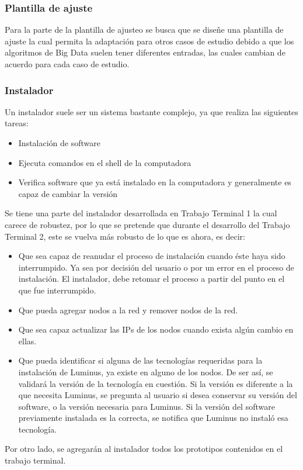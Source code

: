 \subsubsection{Plantilla de ajuste}
Para la parte de la plantilla de ajusteo se busca que se diseñe una plantilla de ajuste la cual permita la adaptación para otros casos de estudio debido a que los algoritmos de Big Data suelen tener diferentes entradas, las cuales cambian de acuerdo para cada caso de estudio.
\\
\subsubsection{Instalador}
Un instalador suele ser un sistema bastante complejo, ya que realiza las siguientes tareas:\\
\begin{itemize}
	\item Instalación de software
	\item Ejecuta comandos en el shell de la computadora
	\item Verifica software que ya está instalado en la computadora y generalmente es capaz de cambiar la versión
\end{itemize}
Se tiene una parte del instalador desarrollada en Trabajo Terminal 1 la cual carece de robustez, por lo que se pretende que durante el desarrollo del Trabajo Terminal 2, este se vuelva más robusto de lo que es ahora, es decir:
\begin{itemize}
	\item Que sea capaz de reanudar el proceso de instalación cuando éste haya sido interrumpido. Ya sea por decisión del usuario o por un error en el proceso de instalación. El instalador, debe retomar el proceso a partir del punto en el que fue interrumpido.
	\item Que pueda agregar nodos a la red y remover nodos de la red.
	\item Que sea capaz actualizar las IPs de los nodos cuando exista algún cambio en ellas.
	\item Que pueda identificar si alguna de las tecnologías requeridas para la instalación de Luminus, ya existe en alguno de los nodos. De ser así, se validará la versión de la tecnología en cuestión. Si la versión es diferente a la que necesita Luminus, se pregunta al usuario si desea conservar su versión del software, o la versión necesaria para Luminus. Si la versión del software previamente instalada es la correcta, se notifica que Luminus no instaló esa tecnología.
\end{itemize}
Por otro lado, se agregarán al instalador todos los prototipos contenidos en el trabajo terminal.
